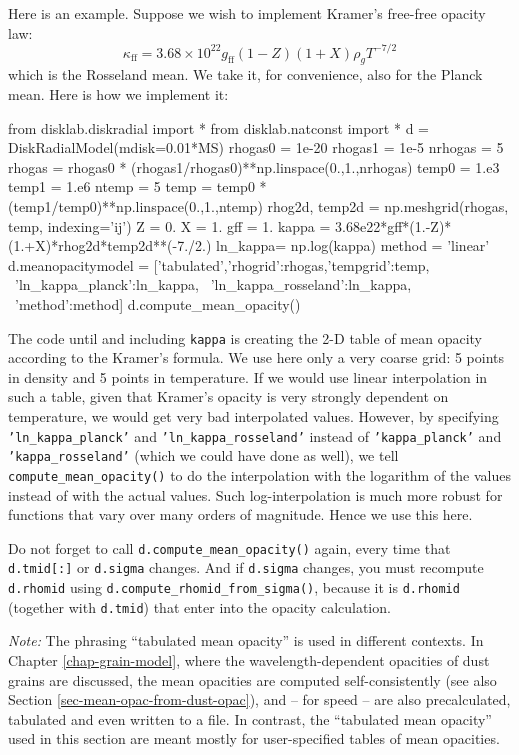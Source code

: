 \documentclass{book}
\newcommand{\code}[1]{{\small\tt #1}}
\begin{document}
Here is an example. Suppose we wish to implement Kramer's free-free opacity law:
\begin{equation}
\kappa_{\mathrm{ff}} = 3.68\times 10^{22}g_{\mathrm{ff}}(1-Z)(1+X)\rho_{g}T^{-7/2}
\end{equation}
which is the Rosseland mean. We take it, for convenience, also for
the Planck mean. Here is how we implement it:
\begin{codebox}
from disklab.diskradial import *
from disklab.natconst import *
d       = DiskRadialModel(mdisk=0.01*MS)
rhogas0 = 1e-20
rhogas1 = 1e-5
nrhogas = 5
rhogas  = rhogas0 * (rhogas1/rhogas0)**np.linspace(0.,1.,nrhogas)
temp0   = 1.e3
temp1   = 1.e6
ntemp   = 5
temp    = temp0 * (temp1/temp0)**np.linspace(0.,1.,ntemp)
rhog2d, temp2d = np.meshgrid(rhogas, temp, indexing='ij')
Z       = 0.
X       = 1.
gff     = 1.
kappa   = 3.68e22*gff*(1.-Z)*(1.+X)*rhog2d*temp2d**(-7./2.)
ln_kappa= np.log(kappa)
method  = 'linear'
d.meanopacitymodel = ['tabulated',{'rhogrid':rhogas,'tempgrid':temp, \
                                   'ln_kappa_planck':ln_kappa,       \
                                   'ln_kappa_rosseland':ln_kappa,    \
                                   'method':method}]
d.compute_mean_opacity()
\end{codebox}
The code until and including \code{kappa} is creating the 2-D table of mean
opacity according to the Kramer's formula. We use here only a very coarse grid:
5 points in density and 5 points in temperature.  If we would use linear
interpolation in such a table, given that Kramer's opacity is very strongly
dependent on temperature, we would get very bad interpolated values. However, by
specifying \code{'ln\_kappa\_planck'} and \code{'ln\_kappa\_rosseland'} instead
of \code{'kappa\_planck'} and \code{'kappa\_rosseland'} (which we could have
done as well), we tell \code{compute\_mean\_opacity()} to do the interpolation
with the logarithm of the values instead of with the actual values. Such
log-interpolation is much more robust for functions that vary over many
orders of magnitude. Hence we use this here.

Do not forget to call \code{d.compute\_mean\_opacity()} again, every
time that \code{d.tmid[:]} or \code{d.sigma} changes. And if
\code{d.sigma} changes, you must recompute \code{d.rhomid} using
\code{d.compute\_rhomid\_from\_sigma()}, because it is \code{d.rhomid}
(together with \code{d.tmid}) that enter into the opacity calculation.

{\em Note:} The phrasing ``tabulated mean opacity'' is used in different
contexts. In Chapter \ref{chap-grain-model}, where the wavelength-dependent
opacities of dust grains are discussed, the mean opacities are computed
self-consistently (see also Section \ref{sec-mean-opac-from-dust-opac}), and --
for speed -- are also precalculated, tabulated and even written to a file. In
contrast, the ``tabulated mean opacity'' used in this section are meant mostly
for user-specified tables of mean opacities.
\end{document}

